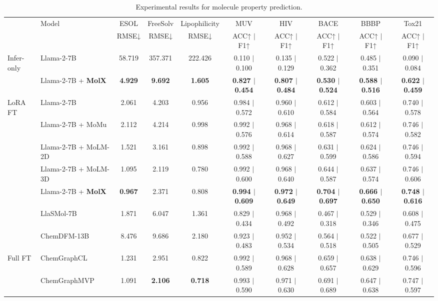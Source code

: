 \begin{table*}[!ht]
\centering
\caption{Experimental results for molecule property prediction.}
\label{molecule-property-prediction}
\setlength{\tabcolsep}{2.99pt}
\renewcommand{\arraystretch}{0.90}
\scriptsize

\begin{tabular*}{\linewidth}{@{\extracolsep{\fill}}ll|cccccccc}
\toprule

\multirow[t]{2}{*}{} &\multirow[t]{2}{*}{Model} &ESOL &FreeSolv &Lipophilicity &MUV &HIV &BACE &BBBP &Tox21 \\
& &RMSE↓ &RMSE↓ &RMSE↓ &ACC↑ $|$ F1↑ &ACC↑ $|$ F1↑ &ACC↑ $|$ F1↑ &ACC↑ $|$ F1↑ &ACC↑ $|$ F1↑ \\
\midrule
\multirow[t]{2}{*}{Infer-only}
&Llama-2-7B                 &58.719 &357.371 &222.426 &0.110 $|$ 0.100 &0.135 $|$ 0.129 &0.522 $|$ 0.362 &0.485 $|$ 0.351 &0.090 $|$ 0.084 \\
&Llama-2-7B + \textbf{MolX} &\phantom{5}\textbf{4.929} &\phantom{35}\textbf{9.692} &\phantom{22}\textbf{1.605} &\textbf{0.827 $|$ 0.454} &\textbf{0.807 $|$ 0.484} &\textbf{0.530 $|$ 0.524} &\textbf{0.588 $|$ 0.516} &\textbf{0.622 $|$ 0.459} \\
\midrule
\multirow[t]{5}{*}{LoRA FT}
&Llama-2-7B                 &\phantom{5}2.061 &\phantom{35}4.203 &\phantom{22}0.956 &0.984 $|$ 0.572 &0.960 $|$ 0.610 &0.612 $|$ 0.584 &0.603 $|$ 0.564 &0.740 $|$ 0.578 \\
&Llama-2-7B + MoMu          &\phantom{5}2.112 &\phantom{35}4.214 &\phantom{22}0.998 &0.992 $|$ 0.576 &0.968 $|$ 0.614 &0.618 $|$ 0.587 &0.612 $|$ 0.574 &0.746 $|$ 0.582 \\
&Llama-2-7B + MoLM-2D       &\phantom{5}1.521 &\phantom{35}3.161 &\phantom{22}0.898 &0.992 $|$ 0.588 &0.968 $|$ 0.627 &0.631 $|$ 0.599 &0.624 $|$ 0.586 &0.746 $|$ 0.594 \\
&Llama-2-7B + MoLM-3D       &\phantom{5}1.095 &\phantom{35}2.119 &\phantom{22}0.780 &0.992 $|$ 0.600 &0.968 $|$ 0.640 &0.644 $|$ 0.587 &0.637 $|$ 0.574 &0.746 $|$ 0.606 \\
&Llama-2-7B + \textbf{MolX} &\phantom{5}\textbf{0.967} &\phantom{35}2.371 &\phantom{22}0.808 &\textbf{0.994 $|$ 0.609} &\textbf{0.972 $|$ 0.649} &\textbf{0.704 $|$ 0.697} &\textbf{0.666 $|$ 0.650} &\textbf{0.748 $|$ 0.616} \\
\rowcolor{customgray}
&LlaSMol-7B                 &\phantom{5}1.871 &\phantom{35}6.047 &\phantom{22}1.361 &0.829 $|$ 0.434 &0.968 $|$ 0.492 &0.467 $|$ 0.318 &0.529 $|$ 0.346 &0.608 $|$ 0.475 \\
\rowcolor{customgray}
&ChemDFM-13B                &\phantom{5}8.476 &\phantom{35}9.686 &\phantom{22}2.180 &0.923 $|$ 0.483 &0.952 $|$ 0.534 &0.564 $|$ 0.518 &0.522 $|$ 0.505 &0.677 $|$ 0.529 \\
\midrule
Full FT
&ChemGraphCL  	   	    &\phantom{5}1.231 &\phantom{35}2.951 &\phantom{22}0.822 &0.992 $|$ 0.589 &0.968 $|$ 0.628 &0.659 $|$ 0.657 &0.638 $|$ 0.629 &0.746 $|$ 0.596 \\
&ChemGraphMVP 		    &\phantom{5}1.091 &\phantom{35}\textbf{2.106} &\phantom{22}\textbf{0.718} &0.993 $|$ 0.590 &0.971 $|$ 0.630 &0.691 $|$ 0.689 &0.647 $|$ 0.638 &0.747 $|$ 0.597 \\


\end{tabular*}
\end{table*}

